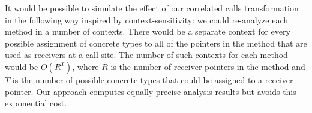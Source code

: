 It would be possible to simulate the effect of our correlated calls
transformation in the following way inspired by context-sensitivity:
we could re-analyze each method in a number
of contexts. There would be a separate context for every possible
assignment of concrete types to all of the pointers in the method that
are used as receivers at a call site. The number of such contexts for
each method would be $O(R^T)$, where $R$ is the number of receiver pointers
in the method and $T$ is the number of possible concrete types that could
be assigned to a receiver pointer. Our approach computes equally precise
analysis results but avoids this exponential cost.


